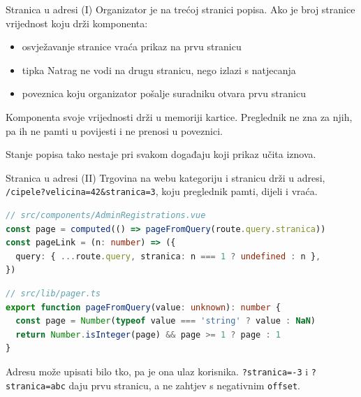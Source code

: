\begin{frame}{Stranica u adresi (I)}
Organizator je na trećoj stranici popisa. Ako je broj stranice vrijednost koju drži komponenta:

\vspace{0.5em}
\begin{itemize}
  \itemsep0.45em
  \item osvježavanje stranice vraća prikaz na prvu stranicu
  \item tipka Natrag ne vodi na drugu stranicu, nego izlazi s natjecanja
  \item poveznica koju organizator pošalje suradniku otvara prvu stranicu
\end{itemize}

\vspace{0.7em}
Komponenta svoje vrijednosti drži u memoriji kartice. Preglednik ne zna za njih, pa ih ne pamti u povijesti i ne prenosi u poveznici.

\vspace{0.7em}
Stanje popisa tako nestaje pri svakom događaju koji prikaz učita iznova.
\end{frame}

\begin{frame}[fragile]{Stranica u adresi (II)}
Trgovina na webu kategoriju i stranicu drži u adresi, \texttt{/cipele?velicina=42\&stranica=3}, koju preglednik pamti, dijeli i vraća.

\begin{lstlisting}[language=typescript]
// src/components/AdminRegistrations.vue
const page = computed(() => pageFromQuery(route.query.stranica))
const pageLink = (n: number) => ({
  query: { ...route.query, stranica: n === 1 ? undefined : n },
})
\end{lstlisting}

\begin{lstlisting}[language=typescript]
// src/lib/pager.ts
export function pageFromQuery(value: unknown): number {
  const page = Number(typeof value === 'string' ? value : NaN)
  return Number.isInteger(page) && page >= 1 ? page : 1
}
\end{lstlisting}

\vspace{0.1em}
Adresu može upisati bilo tko, pa je ona ulaz korisnika. \texttt{?stranica=-3} i \texttt{?stranica=abc} daju prvu stranicu, a ne zahtjev s negativnim \texttt{offset}.
\end{frame}

